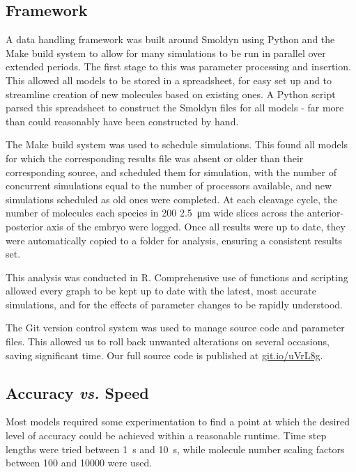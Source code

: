 \documentclass[11pt,a4paper,twocolumn]{article}
\begin{document}
\subsection{Framework}
A data handling framework was built around Smoldyn using Python and the Make build system to allow for many simulations to be run in parallel over extended periods. The first stage to this was parameter processing and insertion. This allowed all models to be stored in a spreadsheet, for easy set up and to streamline creation of new molecules based on existing ones. A Python script parsed this spreadsheet to construct the Smoldyn files for all models - far more than could reasonably have been constructed by hand. 

The Make build system was used to schedule simulations. This found all models for which the corresponding results file was absent or older than their corresponding source, and scheduled them for simulation, with the number of concurrent simulations equal to the number of processors available, and new simulations scheduled as old ones were completed. At each cleavage cycle, the number of molecules each species in 200 \SI{2.5}{\micro\metre} wide slices across the anterior-posterior axis of the embryo were logged. Once all results were up to date, they were automatically copied to a folder for analysis, ensuring a consistent results set.

This analysis was conducted in R. Comprehensive use of functions and scripting allowed every graph to be kept up to date with the latest, most accurate simulations, and for the effects of parameter changes to be rapidly understood.

The Git version control system was used to manage source code and parameter files. This allowed us to roll back unwanted alterations on several occasions, saving significant time. Our full source code is published at \url{git.io/uVrL8g}.

\subsection{Accuracy \textit{vs.} Speed}
Most models required some experimentation to find a point at which the desired level of accuracy could be achieved within a reasonable runtime. Time step lengths were tried between \SI{1}{s} and \SI{10}{s}, while molecule number scaling factors between \num{100} and \num{10000} were used. 
\end{document}
